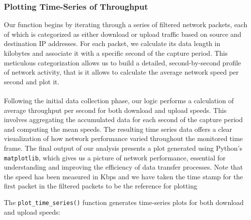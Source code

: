 \documentclass{article}
\begin{document}
\subsubsection{Plotting Time-Series of Throughput}
Our function begins by iterating through a series of filtered network packets, each of which is categorized as either download or upload traffic based on source and destination IP addresses. For each packet, we calculate its data length in kilobytes and associate it with a specific second of the capture period. This meticulous categorization allows us to build a detailed, second-by-second profile of network activity, that is it allows to calculate the average network speed per second and plot it.
\\\\
Following the initial data collection phase, our logic performs a calculation of average throughput per second for both download and upload speeds. This involves aggregating the accumulated data for each second of the capture period and computing the mean speeds. The resulting time series data offers a clear visualization of how network performance varied throughout the monitored time frame. The final output of our analysis presents a plot generated using Python's \verb|matplotlib|, which gives us a picture of network performance, essential for understanding and improving the efficiency of data transfer processes. Note that the speed has been measured in Kbps and we have taken the time stamp for the first packet in the filtered packets to be the reference for plotting

The \texttt{plot\_time\_series()} function generates time-series plots for both download and upload speeds:
\end{document}
